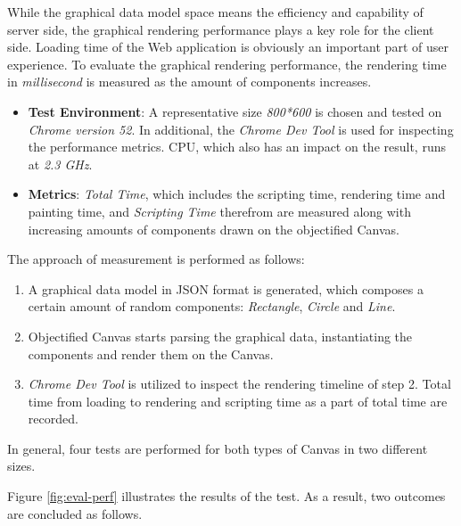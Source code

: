 

While the graphical data model space means the efficiency and capability  of server side, the graphical rendering performance plays a key role for the client side. Loading time of the Web application is obviously an important part of user experience. To evaluate the graphical rendering performance, the rendering time in \textit{millisecond} is measured as the amount of components increases.

\begin{itemize}
  \item \textbf{Test Environment}: A representative size \textit{800*600} is chosen and tested on \textit{Chrome version 52}. In additional, the \textit{Chrome Dev Tool} is used for inspecting the performance metrics. CPU, which also has an impact on the result, runs at \textit{2.3 GHz}.
  \item \textbf{Metrics}: \textit{Total Time}, which includes the scripting time, rendering time and painting time, and \textit{Scripting Time} therefrom are measured along with increasing amounts of components drawn on the objectified Canvas. 
\end{itemize}

The approach of measurement is performed as follows:

\begin{enumerate}
  \item A graphical data model in JSON format is generated, which composes a certain amount of random components: \textit{Rectangle}, \textit{Circle} and \textit{Line}.
  \item Objectified Canvas starts parsing the graphical data, instantiating the components and render them on the Canvas.
  \item \textit{Chrome Dev Tool} is utilized to inspect the rendering timeline of step 2. Total time from loading to rendering and scripting time as a part of total time are recorded.
\end{enumerate}
In general, four tests are performed for both types of Canvas in two different sizes. 

Figure \ref{fig:eval-perf} illustrates the results of the test. As a result, two outcomes are concluded as follows.

